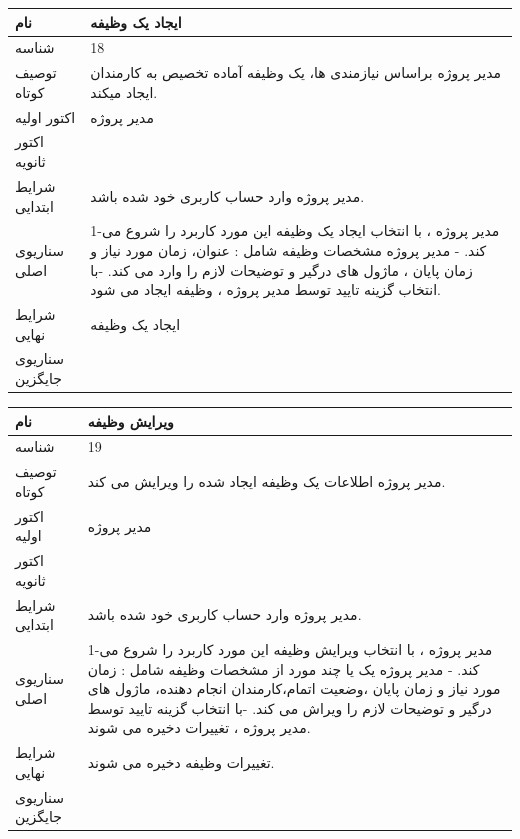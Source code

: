 \vspace{2cm}

\begin{tabular}{|p{2cm}|p{10cm}|}
\hline
نام
&
ایجاد یک وظیفه
\\
\hline
شناسه
&
18
\\
\hline
توصیف کوتاه
&
مدیر پروژه براساس نیازمندی ها، یک وظیفه آماده تخصیص به کارمندان ایجاد میکند.
\\
\hline
اکتور اولیه
&
مدیر پروژه
\\
\hline
اکتور ثانویه
&

\\
\hline
شرایط ابتدایی
&
مدیر پروژه وارد حساب کاربری خود شده باشد. 
\\
\hline
سناریوی اصلی
&
1-مدیر پروژه ، با انتخاب ایجاد یک وظیفه  این مورد کاربرد را شروع می کند.
\newline
2- مدیر پروژه مشخصات وظیفه شامل : عنوان، زمان مورد نیاز و زمان پایان ، ماژول های درگیر و توضیحات لازم را وارد می کند. 
\newline
3-با انتخاب گزینه تایید توسط مدیر پروژه ، وظیفه ایجاد می شود.
\\
\hline
شرایط نهایی
&
ایجاد یک وظیفه
\\
\hline
سناریوی جایگزین
&

\\
\hline
\end{tabular}

\vspace{2cm}

\begin{tabular}{|p{2cm}|p{10cm}|}
\hline
نام
&
ویرایش وظیفه
\\
\hline
شناسه
&
19
\\
\hline
توصیف کوتاه
&
مدیر پروژه اطلاعات یک وظیفه ایجاد شده را ویرایش می کند. 
\\
\hline
اکتور اولیه
&
مدیر پروژه
\\
\hline
اکتور ثانویه
&

\\
\hline
شرایط ابتدایی
&
مدیر پروژه وارد حساب کاربری خود شده باشد. 
\\
\hline
سناریوی اصلی
&
1-مدیر پروژه ، با انتخاب ویرایش وظیفه  این مورد کاربرد را شروع می کند.
\newline
2- مدیر پروژه یک یا چند مورد از مشخصات وظیفه شامل : زمان مورد نیاز و زمان پایان ،وضعیت اتمام،کارمندان انجام دهنده،  ماژول های درگیر و توضیحات لازم را ویراش می کند. 
\newline
3-با انتخاب گزینه تایید توسط مدیر پروژه ، تغییرات دخیره می شوند.
\\
\hline
شرایط نهایی
&
تغییرات وظیفه دخیره می شوند.
\\
\hline
سناریوی جایگزین
&

\\
\hline
\end{tabular}

